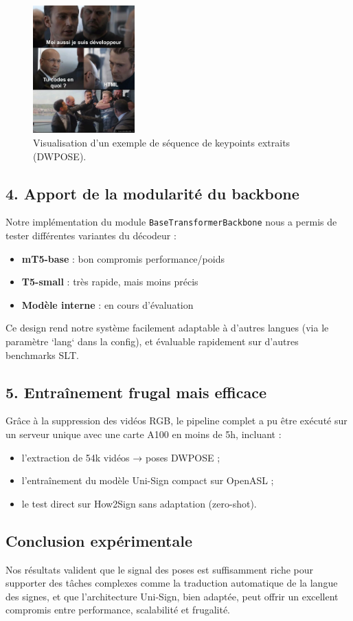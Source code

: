 \begin{figure}[h]
    \centering
    \includegraphics[width=0.35\textwidth]{figures/dev_joke.png}
    \caption{Visualisation d’un exemple de séquence de keypoints extraits (DWPOSE).}
    \label{fig:keypoints}
\end{figure}

\subsection*{4. Apport de la modularité du backbone}

Notre implémentation du module \texttt{BaseTransformerBackbone} nous a permis de tester différentes variantes du décodeur :
\begin{itemize}
    \item \textbf{mT5-base} : bon compromis performance/poids
    \item \textbf{T5-small} : très rapide, mais moins précis
    \item \textbf{Modèle interne} : en cours d’évaluation
\end{itemize}

Ce design rend notre système facilement adaptable à d’autres langues (via le paramètre `lang` dans la config), et évaluable rapidement sur d’autres benchmarks SLT.

\subsection*{5. Entraînement frugal mais efficace}

Grâce à la suppression des vidéos RGB, le pipeline complet a pu être exécuté sur un serveur unique avec une carte A100 en moins de 5h, incluant :
\begin{itemize}
    \item l’extraction de 54k vidéos → poses DWPOSE ;
    \item l’entraînement du modèle Uni-Sign compact sur OpenASL ;
    \item le test direct sur How2Sign sans adaptation (zero-shot).
\end{itemize}

\subsection*{Conclusion expérimentale}

Nos résultats valident que le signal des poses est suffisamment riche pour supporter des tâches complexes comme la traduction automatique de la langue des signes, et que l’architecture Uni-Sign, bien adaptée, peut offrir un excellent compromis entre performance, scalabilité et frugalité.
